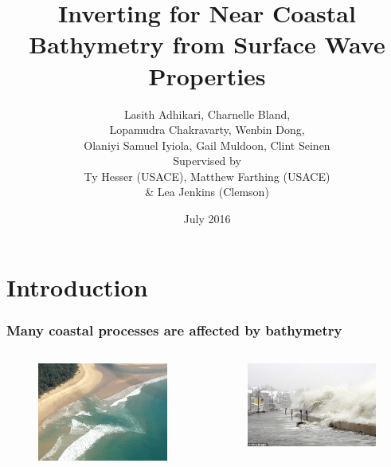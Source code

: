 \documentclass[7pt]{beamer}
\title[Bathymetry Inversion from Waves]{Inverting for Near Coastal Bathymetry from Surface Wave Properties}
\author[]{ 
Lasith Adhikari, Charnelle Bland, \\
Lopamudra Chakravarty, Wenbin Dong, \\
Olaniyi Samuel Iyiola, Gail Muldoon, Clint Seinen \\
\vspace{5mm}
Supervised by\\ Ty  Hesser (USACE), Matthew Farthing (USACE) \\ \& Lea Jenkins (Clemson)}
\institute[IMSM]{Industrial Mathematical and Statistical Modeling Workshop}
\date{July 2016}
\begin{document}
\frame{\titlepage}

\section{Introduction}

\begin{frame}
    \frametitle{Many coastal processes are affected by bathymetry}
        \begin{columns}
                \begin{figure}[h!]
                		\includegraphics[width=1\linewidth]{img/Rip_C.jpg}\hfill
                \end{figure}              
                \begin{figure}
                		\includegraphics[width=1\linewidth]{img/C_Flood.jpg}\vfill

\end{figure}
\end{columns}
\end{frame}
\end{document}
